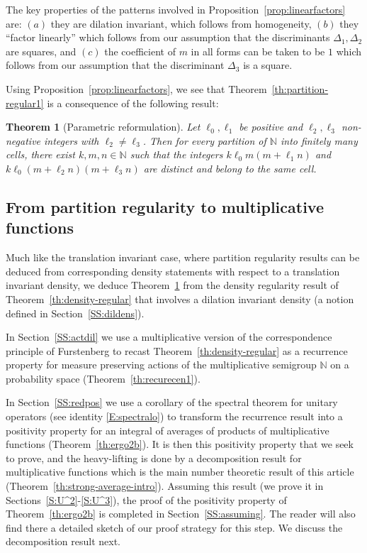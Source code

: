 \documentclass[11pt]{amsart}
\newtheorem{theorem}[lemma]{Theorem}
\theoremstyle{definition}
\begin{document}
The  key properties of the patterns involved in Proposition~\ref{prop:linearfactors} are: $(a)$
they are  dilation invariant, which follows from homogeneity, $(b)$
they ``factor linearly''
which follows from our assumption that the discriminants $\Delta_1,\Delta_2$ are
squares,
 and $(c)$ the coefficient of $m$ in all forms can be taken to be $1$ which follows from our assumption that the discriminant $\Delta_3$ is a square.

Using Proposition~\ref{prop:linearfactors}, we see that
Theorem~\ref{th:partition-regular1}  is a consequence of the
following result:
\begin{theorem}[Parametric reformulation]
\label{th:partition-regular2}
Let $\ell_0,\ell_1$ be positive and $\ell_2,\ell_3$ non-negative integers
with $\ell_2\neq \ell_3$.
Then for every partition of ${{\mathbb N}}$ into
finitely many cells, there exist $k,m,n\in{{\mathbb N}}$ such that the integers
$k\ell_0m(m+\ell_1n)$ and $k\ell_0(m+\ell_2n)(m+\ell_3n)$ are
distinct and belong to  the same cell.
\end{theorem}

\subsection{From partition regularity to multiplicative functions}\label{SS:link}

Much like the translation invariant case, where partition regularity
results can be deduced from corresponding density statements with
respect to a translation invariant density, we deduce
Theorem~\ref{th:partition-regular2}
  from the density regularity result of Theorem~\ref{th:density-regular} that
involves a dilation invariant density (a notion defined in
Section~\ref{SS:dildens}).

In Section~\ref{SS:actdil} we use a multiplicative version of the
correspondence principle of Furstenberg to recast
Theorem~\ref{th:density-regular}  as a recurrence property for
measure preserving actions of the multiplicative semigroup ${{\mathbb N}}$ on a
probability space (Theorem~\ref{th:recurecen1}).

In Section~\ref{SS:redpos} we   use a corollary of the spectral
theorem for unitary operators  (see identity \eqref{E:spectralo}) to
transform the recurrence result into   a
 positivity property  for an integral of averages of products of multiplicative functions
 (Theorem~\ref{th:ergo2b}).
 It is then this positivity property that we seek to prove,
and the heavy-lifting is done by a decomposition result for
multiplicative functions which is the main number theoretic result
of this article (Theorem~\ref{th:strong-average-intro}). Assuming
this result (we prove it in Sections~\ref{S:U^2}-\ref{S:U^3}), the proof of the positivity property of
Theorem~\ref{th:ergo2b} is completed in Section~\ref{SS:assuming}.
The reader will also find there
 a detailed sketch
of our proof strategy for this step. We discuss the decomposition
result next.
\end{document}
